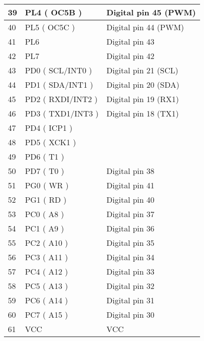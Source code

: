 \begin{longtable}[c]{|l|l|l|}
    39         & PL4 ( OC5B )             & Digital pin 45 (PWM)  \\ \hline
    40         & PL5 ( OC5C )             & Digital pin 44 (PWM)  \\ \hline
    41         & PL6                      & Digital pin 43        \\ \hline
    42         & PL7                      & Digital pin 42        \\ \hline
    43         & PD0 ( SCL/INT0 )         & Digital pin 21 (SCL)  \\ \hline
    44         & PD1 ( SDA/INT1 )         & Digital pin 20 (SDA)  \\ \hline
    45         & PD2 ( RXDI/INT2 )        & Digital pin 19 (RX1)  \\ \hline
    46         & PD3 ( TXD1/INT3 )        & Digital pin 18 (TX1)  \\ \hline
    47         & PD4 ( ICP1 )             &                       \\ \hline
    48         & PD5 ( XCK1 )             &                       \\ \hline
    49         & PD6 ( T1 )               &                       \\ \hline
    50         & PD7 ( T0 )               & Digital pin 38        \\ \hline
    51         & PG0 ( WR )               & Digital pin 41        \\ \hline
    52         & PG1 ( RD )               & Digital pin 40        \\ \hline
    53         & PC0 ( A8 )               & Digital pin 37        \\ \hline
    54         & PC1 ( A9 )               & Digital pin 36        \\ \hline
    55         & PC2 ( A10 )              & Digital pin 35        \\ \hline
    56         & PC3 ( A11 )              & Digital pin 34        \\ \hline
    57         & PC4 ( A12 )              & Digital pin 33        \\ \hline
    58         & PC5 ( A13 )              & Digital pin 32        \\ \hline
    59         & PC6 ( A14 )              & Digital pin 31        \\ \hline
    60         & PC7 ( A15 )              & Digital pin 30        \\ \hline
    61         & VCC                      & VCC                   \\ \hline

\end{longtable}
